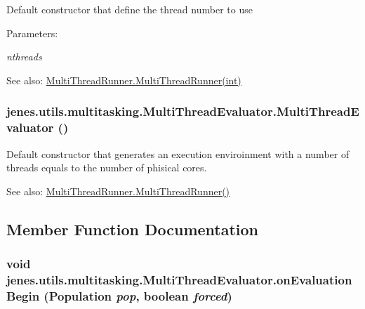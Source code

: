 Default constructor that define the thread number to use \begin{Desc}
\item[Parameters:]
\begin{description}
\item[{\em nthreads}]\end{description}
\end{Desc}
\begin{Desc}
\item[See also:]\hyperlink{classjenes_1_1utils_1_1multitasking_1_1_multi_thread_runner_6319362b08c06d8bf26989407d223c31}{MultiThreadRunner.MultiThreadRunner(int)} \end{Desc}
\hypertarget{classjenes_1_1utils_1_1multitasking_1_1_multi_thread_evaluator_c9949bf8de0efb0cb47feb2df56140ff}{
\subsubsection[MultiThreadEvaluator]{\setlength{\rightskip}{0pt plus 5cm}jenes.utils.multitasking.MultiThreadEvaluator.MultiThreadEvaluator ()}}
\label{classjenes_1_1utils_1_1multitasking_1_1_multi_thread_evaluator_c9949bf8de0efb0cb47feb2df56140ff}


Default constructor that generates an execution enviroinment with a number of threads equals to the number of phisical cores. \begin{Desc}
\item[See also:]\hyperlink{classjenes_1_1utils_1_1multitasking_1_1_multi_thread_runner_b0815486f3159f086cd06ccab94df319}{MultiThreadRunner.MultiThreadRunner()} \end{Desc}


\subsection{Member Function Documentation}
\hypertarget{classjenes_1_1utils_1_1multitasking_1_1_multi_thread_evaluator_2a9d9427ca8c2b8a9dfc541c85bada42}{
\subsubsection[onEvaluationBegin]{\setlength{\rightskip}{0pt plus 5cm}void jenes.utils.multitasking.MultiThreadEvaluator.onEvaluationBegin (Population {\em pop}, \/  boolean {\em forced})}}
\label{classjenes_1_1utils_1_1multitasking_1_1_multi_thread_evaluator_2a9d9427ca8c2b8a9dfc541c85bada42}


